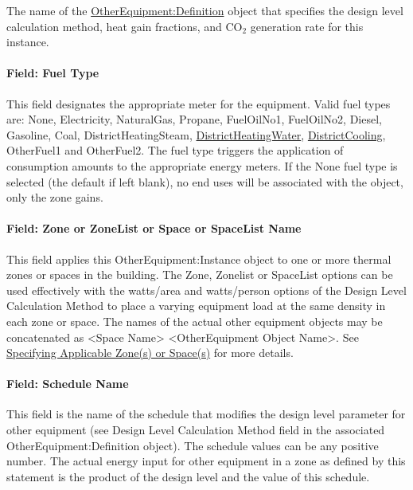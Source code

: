 The name of the \hyperref[otherequipmentdefinition]{OtherEquipment:Definition} object that specifies the design level calculation method, heat gain fractions, and CO\(_{2}\) generation rate for this instance.

\paragraph{Field: Fuel Type}\label{field-fuel-use-type-other-instance}

This field designates the appropriate meter for the equipment. Valid fuel types are: None, Electricity, NaturalGas, Propane, FuelOilNo1, FuelOilNo2, Diesel, Gasoline, Coal, DistrictHeatingSteam, \hyperref[districtheating]{DistrictHeatingWater}, \hyperref[districtcooling]{DistrictCooling}, OtherFuel1 and OtherFuel2. The fuel type triggers the application of consumption amounts to the appropriate energy meters. If the None fuel type is selected (the default if left blank), no end uses will be associated with the object, only the zone gains.

\paragraph{Field: Zone or ZoneList or Space or SpaceList Name}\label{othereq-field-zone-or-zonelist-name-000-other-instance}

This field applies this OtherEquipment:Instance object to one or more thermal zones or spaces in the building. The Zone, Zonelist or SpaceList options can be used effectively with the watts/area and watts/person options of the Design Level Calculation Method to place a varying equipment load at the same density in each zone or space. The names of the actual other equipment objects may be concatenated as \textless{}Space Name\textgreater{} \textless{}OtherEquipment Object Name\textgreater{}. See \hyperref[specifying-applicable-zones-or-spaces]{Specifying Applicable Zone(s) or Space(s)} for more details.

\paragraph{Field: Schedule Name}\label{field-schedule-name-5-000-other-instance}

This field is the name of the schedule that modifies the design level parameter for other equipment (see Design Level Calculation Method field in the associated OtherEquipment:Definition object). The schedule values can be any positive number. The actual energy input for other equipment in a zone as defined by this statement is the product of the design level and the value of this schedule.

